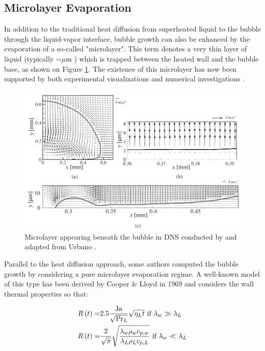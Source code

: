 \subsection{Microlayer Evaporation}
\label{subsec:microlayer}

In addition to the traditional heat diffusion from superheated liquid to the bubble through the liquid-vapor interface, bubble growth can also be enhanced by the evaporation of a so-called "microlayer". This term denotes a very thin layer of liquid (typically $\sim \mu$m \cite{kossolapov_experimental_2021}) which is trapped between the heated wall and the bubble base, as shown on Figure \ref{fig:ML_Urbano}. The existence of this microlayer has now been supported by both experimental visualizations \cite{kossolapov_experimental_2021, koffman_experimental_1983, chen_detailed_2017, chen_measurement_2020} and numerical investigations \cite{urbano_direct_2018, guion_simulations_2018, bures_modelling_2021}.

\begin{figure}[h!]
\centering
\includegraphics[width=0.7\linewidth]{img/growth/ML_urbano.PNG}
\caption{Microlayer appearing beneath the bubble in DNS conducted by and adapted from Urbano \etal \cite{urbano_direct_2018}.}
\label{fig:ML_Urbano}
\end{figure}


Parallel to the heat diffusion approach, some authors computed the bubble growth by considering a pure microlayer evaporation regime. A well-known model of this type has been derived by Cooper \& Lloyd in 1969 \cite{cooper_microlayer_1969} and considers the wall thermal properties so that:

\begin{align} 
R\parth{t} =& 2.5 \dfrac{\Ja}{\sqrt{\Pr_{L}}}\sqrt{\eta_{L}t}\ \text{if}\ \lambda_{w} \gg \lambda_{L} \\
%
R\parth{t} =& \dfrac{2}{\sqrt{\pi}} \sqrt{\dfrac{\lambda_{w}\rho_{w}c_{p,w}}{\lambda_{L}\rho_{L}c_{p,L}}}\ \text{if}\ \lambda_{w} \ll \lambda_{L}
\end{align}

